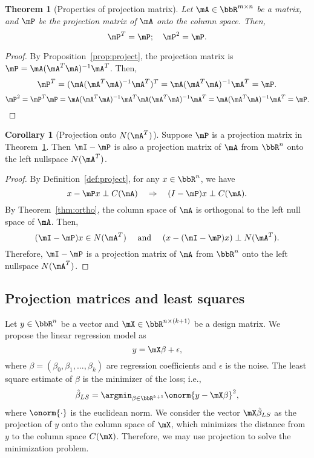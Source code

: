 \documentclass[11pt]{article}
\theoremstyle{plain}
\newtheorem{thm}{Theorem}[section]
\theoremstyle{definition}
\newtheorem{cor}{Corollary}
\begin{document}
\begin{thm}[Properties of projection matrix]\label{thm:projectm}
Let $\mA \in \bbR^{m \times n}$ be a matrix, and $\mP$ be the projection matrix of $\mA$ onto the column space. Then,
	\begin{equation}\label{eq:projectm}
		\mP^T = \mP;\quad  \mP^2 = \mP.
	\end{equation}
\end{thm}
\begin{proof}
	By Proposition~\ref{prop:project}, the projection matrix is $\mP =   \mA(\mA^T \mA)^{-1} \mA^T$. Then,
	\[  \mP^T = (\mA(\mA^T \mA)^{-1} \mA^T )^T = \mA (\mA^T \mA)^{-1} \mA^T = \mP. \]
	\[  \mP^2 = \mP^T \mP =  \mA (\mA^T \mA)^{-1} \mA^T  \mA (\mA^T \mA)^{-1} \mA^T =  \mA (\mA^T \mA)^{-1} \mA^T = \mP. \]
\end{proof}

\begin{cor}[Projection onto $N(\mA^T)$]\label{cor:iprojectm}
	Suppose $\mP$ is a projection matrix in Theorem~\ref{thm:projectm}. Then $\mI-\mP$ is also a projection matrix of $\mA$ from $\bbR^n$ onto the left nullspace $N(\mA^T)$. 
\end{cor}

\begin{proof}
	By Definition~\ref{def:project}, for any $x \in \bbR^n$, we have
	\[ x - \mP x \perp C(\mA) \quad \Rightarrow \quad (I-\mP)x \perp C(\mA). \]
	By Theorem~\ref{thm:ortho}, the column space of $\mA$ is orthogonal to the left null space of $\mA$. Then,
	\[ (\mI-\mP)x \in N(\mA^T) \quad \text{ and }\quad  (x - (\mI-\mP)x) \perp N(\mA^T). \]
	Therefore, $\mI-\mP$ is a projection matrix of $\mA$ from $\bbR^n$ onto the left nullspace $N(\mA^T)$.
\end{proof}

\subsection{Projection matrices and least squares}
Let $y \in \bbR^n$ be a vector and $\mX \in \bbR^{n \times (k+1)}$ be a design matrix. We propose the linear regression model as
\[ y = \mX \beta +\epsilon,\]
where $\beta = (\beta_0,\beta_1,...,\beta_k)$ are regression coefficients and $\epsilon$ is the noise. The least square estimate of $\beta$ is the minimizer of the loss; i.e.,
\[  \hat \beta_{LS} = \argmin_{\beta \in \bbR^{k+1}} \onorm{y - \mX \beta}^2, \]
where $\onorm{\cdot}$ is the euclidean norm. We consider the vector $\mX 
\hat \beta_{LS}$ as the projection of $y$ onto the column space of $\mX$, which minimizes the distance from $y$ to the column space $C(\mX)$. Therefore, we may use projection to solve the minimization problem. 
\end{document}
